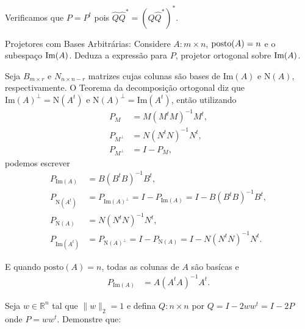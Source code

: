 \begin{questions}
\begin{solution}
\begin{enumerate}
                Verificamos que $P = P^t$ pois $\hat{Q} \hat{Q}^* = \left( \hat{Q} \hat{Q}^* \right)^*$.
        \end{enumerate}
    \end{solution}

     Projetores com Bases Arbitr\'{a}rias: Considere $A : m \times n$, $\text{posto}(A) = n$ e o subespa\c{c}o $\text{Im}(A)$. Deduza a express\~{a}o para $P$, projetor ortogonal sobre $\text{Im}(A)$.
    \begin{solution}
        Seja $B_{m \times r}$ e $N_{n \times n - r}$ matrizes cujas colunas s\~{a}o bases de $\text{Im}(A)$ e $\text{N}(A)$, respectivamente. O Teorema da decomposi\c{c}\~{a}o ortogonal diz que $\text{Im}(A)^\perp = \text{N}(A^t)$ e $\text{N}(A)^\perp = \text{Im}(A^t)$, ent\~{a}o utilizando
        \begin{align*}
            P_M &= M \left( M^t M \right)^{-1} M^t, \\
            P_{M^\perp} &= N \left( N^t N \right)^{-1} N^t, \\
            P_{M^\perp} & = I - P_M,
        \end{align*}
        podemos escrever
        \begin{align*}
            P_{\text{Im}(A)} &= B \left( B^t B \right)^{-1} B^t, \\
            P_{\text{N}(A^t)} &= P_{\text{Im}(A)^\perp} = I - P_{\text{Im}(A)} = I - B \left( B^t B \right)^{-1} B^t, \\
            P_{\text{N}(A)} &= N \left( N^t N \right)^{-1} N^t, \\
            P_{\text{Im}(A^t)} &= P_{\text{N}(A)^\perp} = I - P_{\text{N}(A)} = I - N \left( N^t N \right)^{-1} N^t.
        \end{align*}

        E quando $\text{posto}(A) = n$, todas as colunas de $A$ s\~{a}o bas\'{i}cas e
        \begin{align*}
            P_{\text{Im}(A)} &= A \left( A^t A \right)^{-1} A^t.
        \end{align*}
    \end{solution}

    \question Seja $w \in \mathbb{R}^n$ tal que $\| w \|_2 = 1$ e defina $Q : n \times n$ por $Q = I - 2 w w^t = I - 2P$ onde $P = w w^t$. Demonstre que:
    \begin{parts}

\end{parts}
\end{questions}

